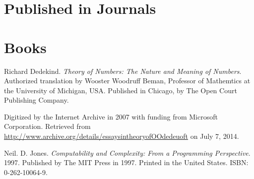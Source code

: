 \begin{thebibliography}{9} %

\section*{Published in Journals}








\section*{Books}


Richard Dedekind. \emph{Theory of Numbers: The Nature and Meaning of Numbers}.
Authorized translation by Wooster Woodruff Beman, Professor of Mathemtics at
the University of Michigan, USA. Published in Chicago, by The Open Court Publishing Company.

Digitized by the Internet Archive in 2007 with funding from Microsoft
Corporation. Retrieved from
\url{http://www.archive.org/details/essaysintheoryofOOdedeuoft} on July 7,
2014.

\backrefprint


Neil. D. Jones. \emph{Computability and Complexity: From a Programming
Perspective}. 1997. Published by The MIT Press in 1997.  Printed in the United
States. ISBN: 0-262-10064-9.


\end{thebibliography}
